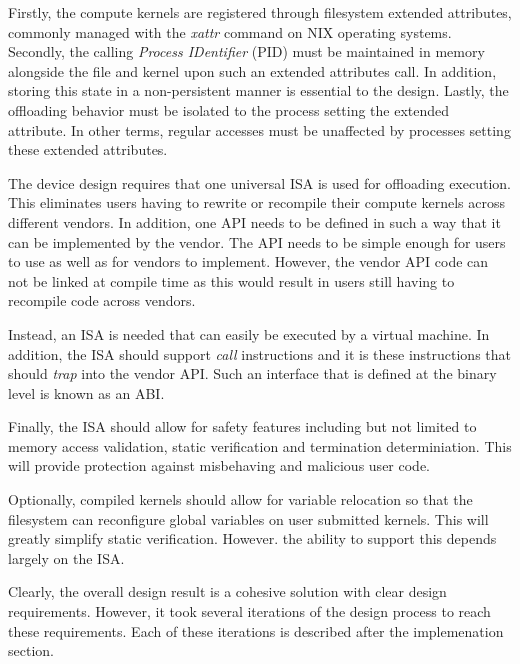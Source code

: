 Firstly, the compute kernels are registered through filesystem extended
attributes, commonly managed with the \textit{xattr} command on NIX operating
systems. Secondly, the calling \textit{Process IDentifier} (PID) must be
maintained in memory alongside the file and kernel upon such an extended
attributes call. In addition, storing this state in a non-persistent manner is
essential to the design. Lastly, the offloading behavior must be isolated to the
process setting the extended attribute. In other terms, regular accesses must
be unaffected by processes setting these extended attributes.

The device design requires that one universal ISA is used for offloading
execution. This eliminates users having to rewrite or recompile their compute
kernels across different vendors. In addition, one API needs to be defined in
such a way that it can be implemented by the vendor. The API needs to be
simple enough for users to use as well as for vendors to implement. However, the
vendor API code can not be linked at compile time as this would result in users
still having to recompile code across vendors.

Instead, an ISA is needed that can easily be executed by a virtual machine. In
addition, the ISA should support \textit{call} instructions and it is these
instructions that should \textit{trap} into the vendor API. Such an interface
that is defined at the binary level is known as an ABI.

Finally, the ISA should allow for safety features including but not limited to 
memory access validation, static verification and termination determiniation.
This will provide protection against misbehaving and malicious user code.

Optionally, compiled kernels should allow for variable relocation so that the
filesystem can reconfigure global variables on user submitted kernels. This
will greatly simplify static verification. However. the ability to support this
depends largely on the ISA.

Clearly, the overall design result is a cohesive solution with clear design
requirements. However, it took several iterations of the design process to
reach these requirements. Each of these iterations is described after the
implemenation section.

